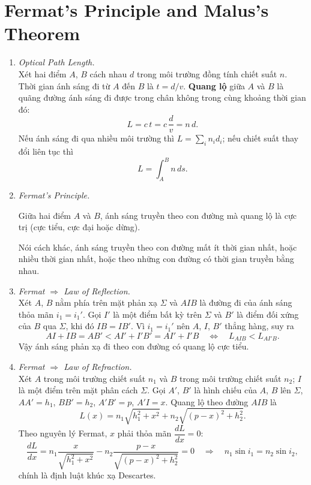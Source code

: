 \section{Fermat's Principle and Malus's Theorem}
\begin{enumerate}
\item \textit{Optical Path Length.}\\
Xét hai điểm $A$, $B$ cách nhau $d$ trong môi trường đồng tính chiết suất $n$. Thời gian ánh sáng đi từ $A$ đến $B$ là $t = d/v$. \textbf{Quang lộ} giữa $A$ và $B$ là quãng đường ánh sáng đi được trong chân không trong cùng khoảng thời gian đó:
\[
L = c\,t = c\,\frac{d}{v} = n\,d.
\]
Nếu ánh sáng đi qua nhiều môi trường thì $L = \sum_i n_i d_i$; nếu chiết suất thay đổi liên tục thì
\[
L = \int_A^B n\,ds.
\]

\item \textit{Fermat's Principle.}\\
\begin{theorem}[Fermat]
Giữa hai điểm $A$ và $B$, ánh sáng truyền theo con đường mà quang lộ là cực trị (cực tiểu, cực đại hoặc dừng).
\end{theorem}
Nói cách khác, ánh sáng truyền theo con đường mất ít thời gian nhất, hoặc nhiều thời gian nhất, hoặc theo những con đường có thời gian truyền bằng nhau.

\item \textit{Fermat $\Rightarrow$ Law of Reflection.}\\
Xét $A$, $B$ nằm phía trên mặt phản xạ $\Sigma$ và $AIB$ là đường đi của ánh sáng thỏa mãn $i_1 = i_1'$. Gọi $I'$ là một điểm bất kỳ trên $\Sigma$ và $B'$ là điểm đối xứng của $B$ qua $\Sigma$, khi đó $IB = IB'$. Vì $i_1 = i_1'$ nên $A$, $I$, $B'$ thẳng hàng, suy ra
\[
AI + IB = AB' < AI' + I'B' = AI' + I'B
\quad\Leftrightarrow\quad
L_{AIB} < L_{AI'B}.
\]
Vậy ánh sáng phản xạ đi theo con đường có quang lộ cực tiểu.

\item \textit{Fermat $\Rightarrow$ Law of Refraction.}\\
Xét $A$ trong môi trường chiết suất $n_1$ và $B$ trong môi trường chiết suất $n_2$; $I$ là một điểm trên mặt phân cách $\Sigma$. Gọi $A'$, $B'$ là hình chiếu của $A$, $B$ lên $\Sigma$, $AA' = h_1$, $BB' = h_2$, $A'B' = p$, $A'I = x$.
Quang lộ theo đường $AIB$ là
\begin{equation}\label{eq:fermat-refr}
L(x) = n_1\sqrt{h_1^2 + x^2} + n_2\sqrt{(p - x)^2 + h_2^2}.
\end{equation}
Theo nguyên lý Fermat, $x$ phải thỏa mãn $\dfrac{dL}{dx} = 0$:
\[
\frac{dL}{dx} = n_1\frac{x}{\sqrt{h_1^2 + x^2}} - n_2\frac{p - x}{\sqrt{(p - x)^2 + h_2^2}} = 0
\quad\Rightarrow\quad
n_1\sin i_1 = n_2\sin i_2,
\]
chính là định luật khúc xạ Descartes.


\end{enumerate}
